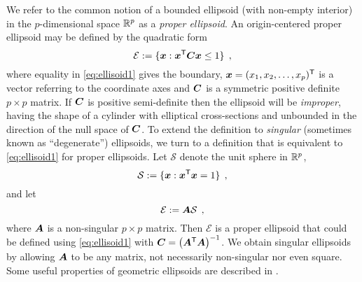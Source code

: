 We refer to the common notion of a bounded ellipsoid (with non-empty interior) in the $p$-dimensional space $\mathbb{R}^{p}$
as a \emph{proper ellipsoid}.
An origin-centered proper ellipsoid
may be defined by the quadratic form
\begin{equation}\label{eq:ellisoid1}
\mathcal{E} := \{ \bm{x}: \bm{x}^\mathsf{T} \bm{C} \bm{x} \le 1 \} \:\: ,
\end{equation}
where equality in \eqref{eq:ellisoid1} gives the boundary,
$\bm{x} = (x_1, x_2, \dots , x_p)^\mathsf{T}$ is a vector referring to the coordinate axes and $\bm{C}$ is a symmetric
positive definite $p \times p$ matrix.
If $\bm{C}$ is positive semi-definite then the ellipsoid will be \emph{improper}, having the shape of a cylinder with elliptical cross-sections and unbounded in the direction of the null 
space of $\bm{C}$.
To extend the definition to \emph{singular} (sometimes known as ``degenerate'') ellipsoids, we turn to a definition that is equivalent to \eqref{eq:ellisoid1} for proper ellipsoids.
Let $\mathcal{S}$ denote the unit sphere in  $\mathbb{R}^{p}$,
\begin{equation}
\mathcal{S} := \{ \bm{x}: \bm{x}^\mathsf{T}\bm{x} =1 \} \:\: ,
\end{equation}
and let
\begin{equation}\label{eq:ellisoidsph}
\mathcal{E} := \bm{A} \mathcal{S} \:\: ,
\end{equation}
where $\bm{A}$ is a non-singular $p \times p$ matrix. Then $\mathcal{E}$ is a proper ellipsoid that could be defined using \eqref{eq:ellisoid1} with $\bm{C} = \left( \bm{A} ^\mathsf{T} \bm{A} \right)^{-1}$.
We obtain singular ellipsoids by allowing $\bm{A}$ to be any matrix, not necessarily non-singular nor even square.
Some useful properties of geometric ellipsoids are described in .
